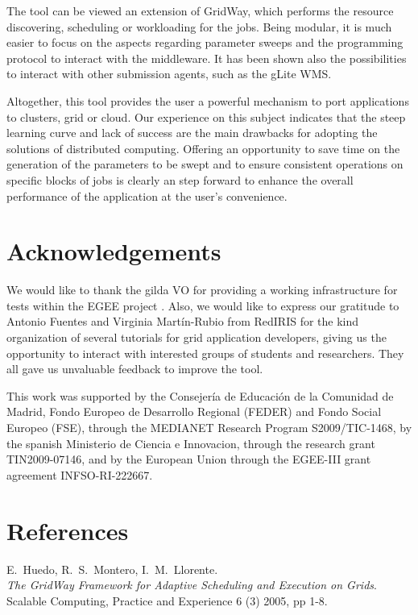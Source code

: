 \documentclass[12pt,a4paper]{article}
\begin{document}
\begin{itemize}
The tool can be viewed an extension of GridWay, which performs the resource discovering, scheduling or workloading for the jobs. Being modular, it is much easier to focus on the aspects regarding parameter sweeps and the programming protocol to interact with the middleware. It has been shown also the possibilities to interact with other submission agents, such as the gLite WMS.

Altogether, this tool provides the user a powerful mechanism to port applications to clusters, grid or cloud. Our experience on this subject indicates that the steep learning curve and lack of success are the main drawbacks for adopting the solutions of distributed computing. Offering an opportunity to save time on the generation of the parameters to be swept and to ensure consistent operations on specific blocks of jobs is clearly an step forward to enhance the overall performance of the application at the user's convenience.


\section*{Acknowledgements}
We would like to thank the gilda VO \cite{gilda} for providing a working infrastructure for tests within the EGEE project \cite{EGEE}. Also, we would like to express our gratitude to Antonio Fuentes and Virginia Martín-Rubio from RedIRIS for the kind organization of several tutorials for grid application developers, giving us the opportunity to interact with interested groups of students and researchers. They all gave us unvaluable feedback to improve the tool. 

This work was supported by the Consejería de Educación de la Comunidad de Madrid, Fondo Europeo de Desarrollo Regional (FEDER) and Fondo Social Europeo (FSE), through the MEDIANET Research Program S2009/TIC-1468, by the spanish Ministerio de Ciencia e Innovacion, through the research grant TIN2009-07146, and by the European Union through the EGEE-III grant agreement INFSO-RI-222667.
 
\section*{References}
\begin{thebibliography}{10}

E.~Huedo, R.~S.~Montero, I.~M.~Llorente.\\
{\em The GridWay Framework for Adaptive Scheduling and Execution on Grids}.\\
Scalable Computing, Practice and Experience 6 (3) 2005, pp 1-8.


\end{thebibliography}
\end{itemize}
\end{document}
